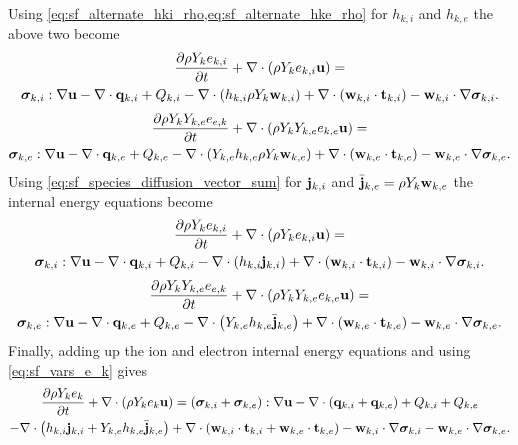 \documentclass[a4paper,11pt]{report}
\begin{document}
Using \cref{eq:sf_alternate_hki_rho,eq:sf_alternate_hke_rho} for $h_{k,i}$ and $h_{k,e}$ the above two become
\begin{multline*}
    \frac{\partial \rho Y_k e_{k,i}}{\partial t} + \nabla \cdot \left( \rho Y_k e_{k,i} \mathbf{u} \right) = \\
    \bm \sigma_{k,i} : \nabla \mathbf{u} - \nabla \cdot \mathbf{q}_{k,i} + Q_{k,i} - \nabla \cdot \left( h_{k,i} \rho Y_k \mathbf{w}_{k,i} \right) + \nabla \cdot \left( \mathbf{w}_{k,i} \cdot \mathbf{t}_{k,i} \right) - \mathbf{w}_{k,i} \cdot \nabla \bm \sigma_{k,i}.
\end{multline*}
\begin{multline*}
    \frac{\partial \rho Y_k Y_{k,e} e_{e,k}}{\partial t} + \nabla \cdot \left( \rho Y_k Y_{k,e} e_{k,e} \mathbf{u} \right) = \\
    \bm \sigma_{k,e} : \nabla \mathbf{u} - \nabla \cdot \mathbf{q}_{k,e} + Q_{k,e} - \nabla \cdot \left( Y_{k,e} h_{k,e} \rho Y_k \mathbf{w}_{k,e} \right) + \nabla \cdot \left( \mathbf{w}_{k,e} \cdot \mathbf{t}_{k,e} \right) - \mathbf{w}_{k,e} \cdot \nabla \bm \sigma_{k,e}.
\end{multline*}
Using \cref{eq:sf_species_diffusion_vector_sum} for $\mathbf{j}_{k,i}$ and $\bar{\mathbf{j}}_{k,e} = \rho Y_k \mathbf{w}_{k,e}$ the internal energy equations become
\begin{multline*}
    \frac{\partial \rho Y_k e_{k,i}}{\partial t} + \nabla \cdot \left( \rho Y_k e_{k,i} \mathbf{u} \right) = \\
    \bm \sigma_{k,i} : \nabla \mathbf{u} - \nabla \cdot \mathbf{q}_{k,i} + Q_{k,i} - \nabla \cdot \left( h_{k,i} \mathbf{j}_{k,i} \right) + \nabla \cdot \left( \mathbf{w}_{k,i} \cdot \mathbf{t}_{k,i} \right) - \mathbf{w}_{k,i} \cdot \nabla \bm \sigma_{k,i}.
\end{multline*}
\begin{multline*}
    \frac{\partial \rho Y_k Y_{k,e} e_{e,k}}{\partial t} + \nabla \cdot \left( \rho Y_k Y_{k,e} e_{k,e} \mathbf{u} \right) = \\
    \bm \sigma_{k,e} : \nabla \mathbf{u} - \nabla \cdot \mathbf{q}_{k,e} + Q_{k,e} - \nabla \cdot \left( Y_{k,e} h_{k,e} \bar{\mathbf{j}}_{k,e} \right) + \nabla \cdot \left( \mathbf{w}_{k,e} \cdot \mathbf{t}_{k,e} \right) - \mathbf{w}_{k,e} \cdot \nabla \bm \sigma_{k,e}.
\end{multline*}
Finally, adding up the ion and electron internal energy equations and using \cref{eq:sf_vars_e_k} gives
\begin{multline}
    \label{eq:sf_alternate_e_k}
    \frac{\partial \rho Y_k e_k}{\partial t} + \nabla \cdot \left( \rho Y_k e_k \mathbf{u} \right) = \left( \bm \sigma_{k,i} + \bm \sigma_{k,e} \right): \nabla \mathbf{u} - \nabla \cdot \left( \mathbf{q}_{k,i} + \mathbf{q}_{k,e} \right) + Q_{k,i} + Q_{k,e} \\
    - \nabla \cdot \left( h_{k,i} \mathbf{j}_{k,i} + Y_{k,e} h_{k,e} \bar{\mathbf{j}}_{k,e} \right) + \nabla \cdot \left( \mathbf{w}_{k,i} \cdot \mathbf{t}_{k,i} + \mathbf{w}_{k,e} \cdot \mathbf{t}_{k,e} \right) - \mathbf{w}_{k,i} \cdot \nabla \bm \sigma_{k,i} - \mathbf{w}_{k,e} \cdot \nabla \bm \sigma_{k,e} .
\end{multline}
\end{document}
